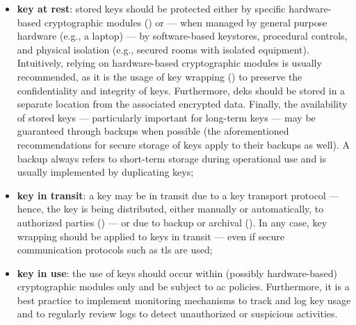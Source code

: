 \begin{itemize}
	\item \textbf{key at rest}: stored keys should be protected either by specific hardware-based cryptographic modules () or --- when managed by general purpose hardware (e.g., a laptop) --- by software-based keystores, procedural controls, and physical isolation (e.g., secured rooms with isolated equipment). Intuitively, relying on hardware-based cryptographic modules is usually recommended, as it is the usage of key wrapping () to preserve the confidentiality and integrity of keys. Furthermore, \glspl{dek} should be stored in a separate location from the associated encrypted data. Finally, the availability of stored keys --- particularly important for long-term keys --- may be guaranteed through backups when possible (the aforementioned recommendations for secure storage of keys apply to their backups as well). A backup always refers to short-term storage during operational use and is usually implemented by duplicating keys;
	\item \textbf{key in transit}: a key may be in transit due to a key transport protocol --- hence, the key is being distributed, either manually or automatically, to authorized parties () --- or due to backup or archival (). In any case, key wrapping should be applied to keys in transit --- even if secure communication protocols such as \gls{tls}
	are used;
	\item \textbf{key in use}: the use of keys should occur within (possibly hardware-based) cryptographic modules only and be subject to \gls{ac} policies.
	Furthermore, it is a best practice to implement monitoring mechanisms to track and log key usage and to regularly review logs to detect unauthorized or suspicious activities.
\end{itemize}


